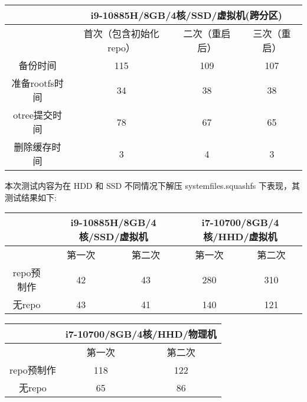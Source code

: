 \documentclass{utart}
\begin{document}
\begin{table}[H]
  \begin{tabular}{|c|ccc|}
  \hline
              & \multicolumn{3}{c|}{i9-10885H/8GB/4核/SSD/虚拟机(跨分区)}                         \\ \hline
              & \multicolumn{1}{c|}{首次（包含初始化repo）} & \multicolumn{1}{c|}{二次（重启后）} & 三次（重启） \\ \hline
  备份时间       & \multicolumn{1}{c|}{115}           & \multicolumn{1}{c|}{109}     & 107    \\ \hline
  准备rootfs时间 & \multicolumn{1}{c|}{34}            & \multicolumn{1}{c|}{38}      & 38     \\ \hline
  otree提交时间  & \multicolumn{1}{c|}{78}            & \multicolumn{1}{c|}{67}      & 65     \\ \hline
  删除缓存时间     & \multicolumn{1}{c|}{3}             & \multicolumn{1}{c|}{4}       & 3      \\ \hline
  \end{tabular}
  \end{table}
本次测试内容为在 HDD 和 SSD 不同情况下解压 systemfiles.squashfs 下表现，其测试结果如下:
\begin{table}[H]
  \begin{tabular}{|c|cc|cc|}
  \hline
   & \multicolumn{2}{c|}{i9-10885H/8GB/4核/SSD/虚拟机} & \multicolumn{2}{c|}{i7-10700/8GB/4核/HHD/虚拟机} \\ \hline
                          & \multicolumn{1}{c|}{第一次} & 第二次 & \multicolumn{1}{c|}{第一次} & 第二次 \\ \hline
  repo预制作 & \multicolumn{1}{c|}{42}  & 43  & \multicolumn{1}{c|}{280} & 310 \\ \hline
  无repo   & \multicolumn{1}{c|}{43}  & 41  & \multicolumn{1}{c|}{140} & 121 \\ \hline
  \end{tabular}
  \end{table}
\begin{table}[H]
  \begin{tabular}{|c|cc|}
  \hline
                          & \multicolumn{2}{c|}{i7-10700/8GB/4核/HHD/物理机} \\ \hline
                          & \multicolumn{1}{c|}{第一次}        & 第二次        \\ \hline
  repo预制作 & \multicolumn{1}{c|}{118}        & 122        \\ \hline
  无repo   & \multicolumn{1}{c|}{65}         & 86         \\ \hline
  \end{tabular}
  \end{table}
\end{document}
